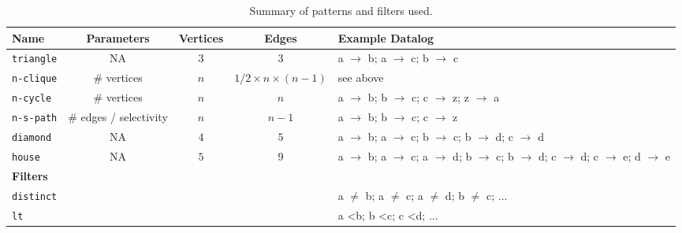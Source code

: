 \begin{table}[]
    \begin{tabular}{@{}lcccp{6cm}@{}}
        \toprule
        Name     & Parameters                 & Vertices & Edges             & Example Datalog                                                                                                                                        \\ \midrule
        \texttt{triangle} & NA                          & $3$        & 3                 & a $\rightarrow$ b; a $\rightarrow$ c; b $\rightarrow$ c                                                                                                \\
        \texttt{n-clique} & \# vertices                & $n$        & $1/2 \times n \times (n - 1)$ & see above                                                                                                                                              \\
        \texttt{n-cycle}  & \# vertices                & $n$        & $n$                 & a $\rightarrow$ b; b $\rightarrow$ c; c $\rightarrow$ z; z $\rightarrow$ a                                                                             \\
        \texttt{n-s-path} & \# edges / selectivity  & $n$       & $n - 1$             & a $\rightarrow$ b; b $\rightarrow$ c; c $\rightarrow$ z                                                                                                \\
        \texttt{diamond}  & NA                         & $4$       & $5$                 & a $\rightarrow$ b; a $\rightarrow$ c; b $\rightarrow$ c; b $\rightarrow$ d; c $\rightarrow$ d                                                          \\
        \texttt{house}    & NA                         & $5$        & $9$                 & a $\rightarrow$ b; a $\rightarrow$ c; a $\rightarrow$ d; b $\rightarrow$ c; b $\rightarrow$ d; c $\rightarrow$ d; c $\rightarrow$ e; d $\rightarrow$ e \\
        \textbf{Filters}   &                            &          &                   &                                                                                                                                                        \\
        \texttt{distinct} &                            &          &                   & a $\neq$ b; a $\neq$ c; a $\neq$ d; b $\neq$ c; ...                                                                                                                    \\
        \texttt{lt}       &                            &          &                   & a \textless b; b \textless c; c \textless d; ...                                                                                                       \\ \bottomrule
    \end{tabular}
    \caption{Summary of patterns and filters used.}
    \label{table:patterns}
\end{table}

